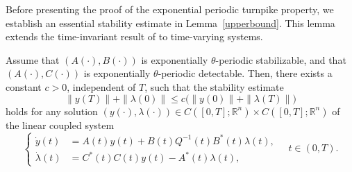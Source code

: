 \documentclass{IEEEtran}
\begin{document}
	Before presenting the proof of the exponential periodic turnpike property, we establish an essential stability estimate in Lemma~\ref{upperbound}. This lemma extends the time-invariant result of \cite[Lemma 2]{TZZ} to time-varying systems.
	\begin{lemma}\label{upperbound}
		Assume that $(A(\cdot),B(\cdot))$ is exponentially $\theta$-periodic stabilizable, and that $(A(\cdot),C(\cdot))$ is exponentially $\theta$-periodic detectable. Then, there exists a constant $c>0$, independent of $T$, such that the stability estimate 
		\begin{equation}\label{7271}
			\|y(T)\|+\|\lambda(0)\|\leq c\big (\|y(0)\|+\|\lambda(T)\|\big)
		\end{equation}
		holds for any solution $(y(\cdot),\lambda(\cdot))\in C([0,T];\mathbb R^n)\times C([0,T];\mathbb R^n)$ of the linear coupled system
		\begin{equation}\label{6181}
			\left\{
			\begin{aligned}
				\dot y(t) &= A(t) y(t)+B(t)Q^{-1}(t)B^*(t)\lambda(t),\\
				\dot\lambda(t)&= C^*(t)C(t)y(t)-A^*(t)\lambda(t),
			\end{aligned}
			\right.\quad t\in(0,T).
		\end{equation}
	\end{lemma}
\end{document}
